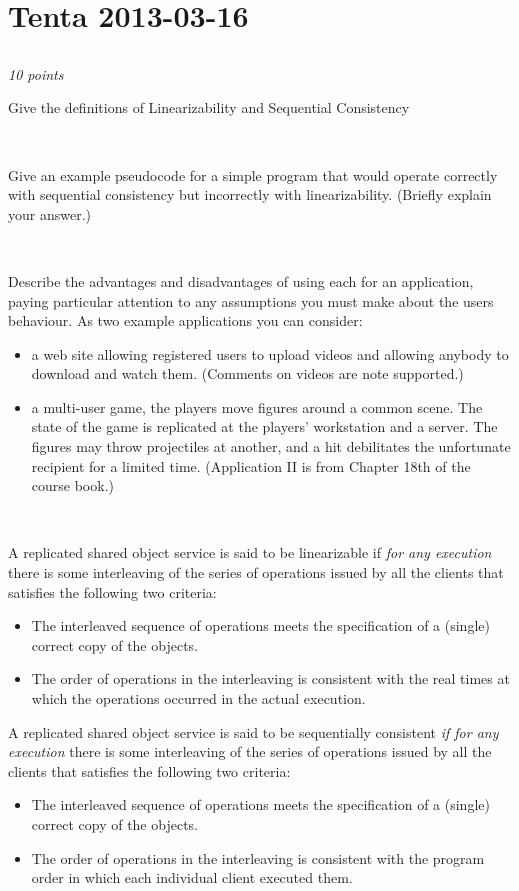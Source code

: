 \documentclass[a4paper]{article}
\newcommand{\points}[1]{\subsection{} \textit{#1 points}\\}
\newcommand{\question}[2][]{
  \parbox[t]{\textwidth}{
    \ifthenelse{\equal{#1}{}}{}{#1)}
    \parbox[t]{0.95\textwidth}{#2}}\\}
\newcommand{\solution}[2][]{
  \ifthenelse{\equal{#1}{} \or \equal{#1}{a}}{\\[3pt]\textit{Solution: }\\[0.1cm]}{}
  \parbox[t]{\textwidth}{
    \ifthenelse{\equal{#1}{}}{}{#1)}
    \parbox[t]{0.95\textwidth}{#2}}\\
}
\newcommand{\highlight}[1]{{\color{blue}#1}}
\begin{document}
\section{Tenta 2013-03-16}
\points{10}
\label{2013-03:linearizability}
\question[a]{
  Give the definitions of Linearizability and Sequential Consistency
}
\question[b]{
  Give an example pseudocode for a simple program that
  would operate correctly with sequential consistency but incorrectly
  with linearizability. (Briefly explain your answer.)
}
\question[c]{
  Describe the advantages and disadvantages of using each
  for an application, paying particular attention to any assumptions
  you must make about the users behaviour. As two example applications
  you can consider:
  \begin{itemize}
    \item a web site allowing registered users to upload videos and
      allowing anybody to download and watch them. (Comments on videos
      are note supported.)
    \item a multi-user game, the players move figures around a common
      scene. The state of the game is replicated at the players'
      workstation and a server. The figures may throw projectiles at
      another, and a hit debilitates the unfortunate recipient for a
      limited time. (Application II is from Chapter 18th of the course
      book.)
  \end{itemize}
}
\solution[a]{A replicated shared object service is said to be
  \highlight{linearizable} if \textit{for any execution} there is
  some interleaving of the series of operations issued by all the
  clients that satisfies the following two criteria:
  \begin{itemize}
    \item The interleaved sequence of operations meets the
      specification of a (single) correct copy of the objects.
    \item The order of operations in the interleaving is consistent
      with the \highlight{real times at which the operations
        occurred in the actual execution.}
  \end{itemize}

  A replicated shared object service is said to be
  \highlight{sequentially consistent} \textit{if for any
    execution} there is some interleaving of the series of operations
  issued by all the clients that satisfies the following two criteria:
  \begin{itemize}
    \item The interleaved sequence of operations meets the
      specification of a (single) correct copy of the objects.
    \item The order of operations in the interleaving is consistent
      with the \highlight{program order in which each individual
        client executed them.}
  \end{itemize}
}
\end{document}
